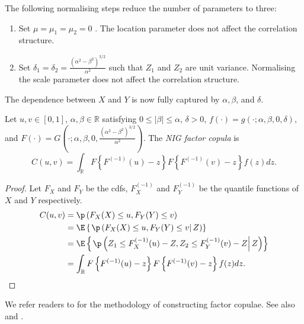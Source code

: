 The following normalising steps reduce the number of parameters to three:
\begin{enumerate}
  \item Set $\mu = \mu_1= \mu_2 = 0$ . The location parameter does not affect the correlation structure.
  \item Set $\delta_1 = \delta_2 = \frac{(\alpha^2-\beta^2)^{3/2}}{\alpha^2}$ such that $Z_1$ and $Z_2$ are unit variance. 
  Normalising the scale parameter does not affect the correlation structure.
\end{enumerate}
The dependence between $X$ and $Y$ is now fully captured by $\alpha, \beta$, and $\delta$.  

% 
\begin{prop}
  Let $u,v \in [0,1]$,
  $\alpha, \beta \in \mathbb{R}$ satisfying $0 \leq |\beta| \leq \alpha$, $\delta >0 $,
  $f(\cdot) = g\left(\cdot; \alpha, \beta, 0, \delta \right)$, 
  and $F (\cdot) = G\left(\cdot; \alpha, \beta, 0, \frac{(\alpha^2-\beta^2)^{3/2}}{\alpha^2}\right)$.
  The {\em NIG factor copula} is 
  \begin{equation*}
    C(u,v) = \int_\mathbb{R} F\left\{F^{(-1)}(u)-z\right\}
    F\left\{F^{(-1)}(v)-z\right\}f(z)dz.
  \end{equation*}

\end{prop}

\begin{proof}
  Let $F_X$ and $F_Y$ be the cdfs, $F_X^{(-1)}$ and $F_Y^{(-1)}$ be the quantile functions of $X$ and $Y$ respectively. 
  \begin{align*}
    C(u,v) &= \p\left(F_X(X) \leq u, F_Y(Y)\leq v\right)\\
           &= \E \left\{\left.\p\left(F_X(X) \leq u, F_Y(Y)\leq v \right|Z\right)\right\}\\
           &= \E \left\{\left.\p\left(Z_1 \leq F_X^{(-1)}(u)-Z, Z_2 \leq F_Y^{(-1)}(v)-Z \right|Z\right)\right\}\\
           &=  \int_\mathbb{R} F\left\{F^{(-1)}(u)-z\right\}F\left\{F^{(-1)}(v)-z\right\}f(z)dz.
  \end{align*} 
\end{proof}

We refer readers to \citet{krupskii2018factor} for the methodology of constructing factor copulae. 
See also \citet[Section 3.10]{joe2014dependence} and \citet{krupskii2013factor}. 

